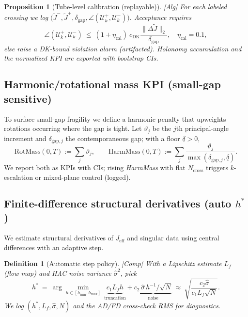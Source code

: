 \documentclass[10pt]{article}
\newcommand{\layertag}[1]{\textup{[#1]}}
\newtheorem{definition}{Definition}
\newtheorem{proposition}{Proposition}
\begin{document}
\begin{proposition}[Tube-level calibration (replayable)]\label{prop:dk-cal}
\emph{\layertag{Alg}}
For each labeled crossing we log $\big(\widetilde J^{-},\widetilde J^{+},\delta_{\mathrm{gap}},\angle(\mathcal U_k^+,\mathcal U_k^-)\big)$.
Acceptance requires
\[
\angle(\mathcal U_k^+,\mathcal U_k^-)\ \le\ (1+\eta_{\mathrm{cal}})\ c_{\mathrm{DK}}\frac{\|\Delta \widetilde J\|_2}{\delta_{\mathrm{gap}}},\quad \eta_{\mathrm{cal}}=0.1,
\]
else raise a \emph{DK-bound violation} alarm (artifacted). Holonomy accumulation and the normalized KPI are exported with bootstrap CIs.
\end{proposition}

\subsection*{Harmonic/rotational mass KPI (small-gap sensitive)}
To surface small-gap fragility we define a harmonic penalty that upweights rotations occurring where the gap is tight.
Let $\vartheta_j$ be the $j$th principal-angle increment and $\delta_{\mathrm{gap},j}$ the contemporaneous gap; with a floor $\underline\delta>0$,
\[
\mathrm{RotMass}(0,T):=\sum_{j}\vartheta_j,
\qquad
\mathrm{HarmMass}(0,T):=\sum_{j}\frac{\vartheta_j}{\max(\delta_{\mathrm{gap},j},\underline\delta)}.
\]
We report both as KPIs with CIs; rising \emph{HarmMass} with flat $N_{\mathrm{cross}}$ triggers $k$-escalation or mixed-plane control (logged).

\subsection*{Finite-difference structural derivatives (auto $h^\ast$)}
We estimate structural derivatives of $J_{\mathrm{eff}}$ and singular data using central differences with an adaptive step.

\begin{definition}[Automatic step policy]\label{def:hstar}
\emph{\layertag{Comp}}
With a Lipschitz estimate $L_f$ (flow map) and HAC noise variance $\hat\sigma^2$, pick
\[
h^\ast \ =\ \arg\min_{h\in[h_{\min},h_{\max}]}\ \underbrace{c_1 L_f h}_{\text{truncation}} + \underbrace{c_2\, \hat\sigma\, h^{-1}/\sqrt{N}}_{\text{noise}}
\ \approx\
\sqrt{\frac{c_2\hat\sigma}{c_1 L_f \sqrt{N}}}.
\]
We log $(h^\ast,L_f,\hat\sigma,N)$ and the AD/FD cross-check RMS for diagnostics.
\end{definition}
\end{document}
